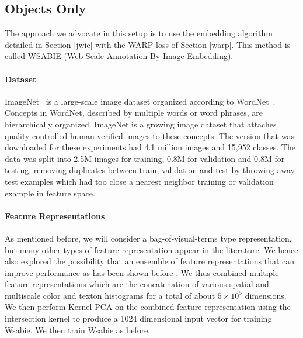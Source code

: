 \subsection{Objects Only}\label{sec:oos}

The approach we advocate in this setup is to use the embedding
algorithm detailed in Section \ref{jwie} with the WARP loss of Section
\ref{warp}.  This method is called {\sc WSABIE} (Web Scale Annotation
By Image Embedding).




\paragraph{Dataset}

ImageNet~\cite{imagenet_cvpr09}
is a large-scale image dataset organized according to WordNet~\cite{wordnet:1998}.
Concepts in WordNet, described by multiple words or word phrases, are
hierarchically organized. ImageNet is a growing image dataset that attaches
quality-controlled human-verified images to  these concepts.
The version that was downloaded for these experiments had 
4.1 million images and 15,952 classes.
The data was split into 2.5M images for training, 0.8M for validation and
0.8M for testing, removing duplicates between train, validation and test
by throwing away test examples which had too close a nearest neighbor training
or validation example in feature space.

\paragraph{Feature Representations}

As mentioned before, we will consider a bag-of-visual-terms type representation,
but many other types of feature representation appear in the literature.
We hence also explored the possibility that an ensemble of feature representations that can 
improve performance as has been shown before \cite{makadia:2008}.
We thus combined multiple feature representations which are the
 concatenation of various spatial \cite{pyramid} and multiscale color and
texton histograms \cite{textons}
for a total of about $5 \times 10^5$ dimensions.
We then perform Kernel PCA \cite{kpca} on the combined feature representation using the intersection
kernel \cite{intersection-kernel} 
to produce a 1024 dimensional input vector for training {\sc Wsabie}. We then train {\sc Wsabie} as before.


